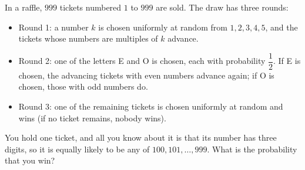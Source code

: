 In a raffle, $999$ tickets numbered $1$ to $999$ are sold. The draw has three rounds:
\begin{itemize}
\item Round 1: a number $k$ is chosen uniformly at random from $1,2,3,4,5$, and the tickets whose numbers are multiples of $k$ advance.
\item Round 2: one of the letters E and O is chosen, each with probability $\dfrac12$. If E is chosen, the advancing tickets with even numbers advance again; if O is chosen, those with odd numbers do.
\item Round 3: one of the remaining tickets is chosen uniformly at random and wins (if no ticket remains, nobody wins).
\end{itemize}
You hold one ticket, and all you know about it is that its number has three digits, so it is equally likely to be any of $100,101,\dots,999$. What is the probability that you win?
